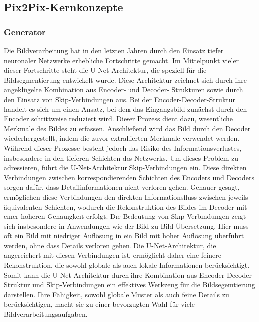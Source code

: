 \subsection{Pix2Pix-Kernkonzepte}
\subsubsection{Generator}
Die Bildverarbeitung hat in den letzten Jahren durch den Einsatz tiefer neuronaler Netzwerke erhebliche Fortschritte gemacht. Im Mittelpunkt vieler dieser Fortschritte steht die U-Net-Architektur, die speziell für die Bildsegmentierung entwickelt wurde. Diese Architektur zeichnet sich durch ihre angeklügelte Kombination aus Encoder- und Decoder- Strukturen sowie durch den Einsatz von Skip-Verbindungen aus.
 \newline
Bei der Encoder-Decoder-Struktur handelt es sich um einen Ansatz, bei dem das Eingangsbild zunächst durch den Encoder schrittweise reduziert wird. Dieser Prozess dient dazu, wesentliche Merkmale des Bildes zu erfassen. Anschließend wird das Bild durch den Decoder wiederhergestellt, indem die zuvor extrahierten Merkmale verwendet werden. Während dieser Prozesse besteht jedoch das Risiko des Informationsverlustes, insbesondere in den tieferen Schichten des Netzwerks.
Um dieses Problem zu adressieren, führt die U-Net-Architektur Skip-Verbindungen ein. Diese direkten Verbindungen zwischen korrespondierenden Schichten des Encoders und Decoders sorgen dafür, dass Detailinformationen nicht verloren gehen. Genauer gesagt, ermöglichen diese Verbindungen den direkten Informationsfluss zwischen jeweils äquivalenten Schichten, wodurch die Rekonstruktion des Bildes im Decoder mit einer höheren Genauigkeit erfolgt. \newline
Die Bedeutung von Skip-Verbindungen zeigt sich insbesondere in Anwendungen wie der Bild-zu-Bild-Übersetzung. Hier muss oft ein Bild mit niedriger Auflösung in ein Bild mit hoher Auflösung überführt werden, ohne dass Details verloren gehen. Die U-Net-Architektur, die angereichert mit diesen Verbindungen ist, ermöglicht daher eine feinere Rekonstruktion, die sowohl globale als auch lokale Informationen berücksichtigt. \newline
Somit kann die U-Net-Architektur durch ihre Kombination aus Encoder-Decoder-Struktur und Skip-Verbindungen ein effektives Werkzeug für die Bildsegemtierung darstellen. Ihre Fähigkeit, sowohl globale Muster als auch feine Details zu berücksichtigen, macht sie zu einer bevorzugten Wahl für viele Bildverarbeitungsaufgaben. \newline
